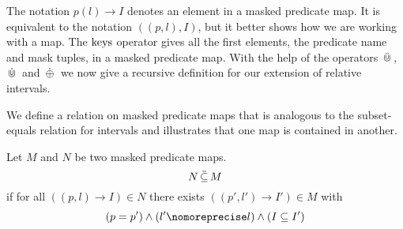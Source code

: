The notation $p(l) \rightarrow I$ denotes an element in a masked predicate map.
It is equivalent to the notation $((p,l), I)$, but it better shows how we are working with a map.
The $\operatorname{keys}$ operator gives all the first elements, the predicate name and mask tuples, in a masked predicate map.
With the help of the operators $\,\ddot{\Cup}\,$, $\,\dot{\Cup}\,$ and $\,\dot{\oplus}\,$ we now give a recursive definition for our extension of relative intervals.

We define a relation on masked predicate maps that is analogous to the subset-equals relation for intervals and illustrates that one map is contained in another.

\begin{definition}
    \label{def:subseteqmap}
    Let $M$ and $N$ be two masked predicate maps.
    \begin{equation*}
        N \,\ddot{\subseteq}\, M
    \end{equation*}
    if for all $((p,l) \to I) \in N$ there exists $((p',l') \to I') \in M$ with
    \begin{equation*}
        (p = p') \land (l' \nomoreprecise l) \land (I \subseteq I')
    \end{equation*}
\end{definition}



